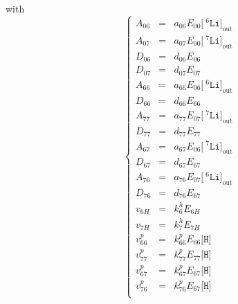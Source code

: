 \documentclass[aps,onecolumn,11pt]{revtex4}
\newcommand{\mychem}[1]{\mathtt{#1}}
\newcommand{\myconc}[1]{\big[#1\big]}
\newcommand{\spLi}[1]{{\!~^{#1}\mychem{Li}}}
\newcommand{\Li}[1]{\myconc{\spLi{#1}}}
\newcommand{\spproton}{\mychem{H}}
\newcommand{\proton}{\myconc{\spproton}}
\newcommand{\myout}[1]{{#1}_{\mathrm{out}}}
\newcommand{\LiOut}[1]{\myout{\Li{#1}}}
\begin{document}
with
\begin{equation}
\left\lbrace
\begin{array}{rcl}%
A_{06}   & = & a_{06} E_{00} \LiOut{6}  \\%
A_{07}   & = & a_{07} E_{00} \LiOut{7}  \\%
D_{06}   & = & d_{06} E_{06}            \\%
D_{07}   & = & d_{07} E_{07}            \\%
A_{66}   & = & a_{66} E_{06} \LiOut{6}  \\%
D_{66}   & = & d_{66} E_{66}            \\%
A_{77}   & = & a_{77} E_{07} \LiOut{7}  \\%
D_{77}   & = & d_{77} E_{77}            \\%
A_{67}   & = & a_{67} E_{06} \LiOut{7}  \\%
D_{67}   & = & d_{67} E_{67}            \\%
A_{76}   & = & a_{76} E_{07} \LiOut{6}  \\%
D_{76}   & = & d_{76} E_{67}            \\%
v_{6H}   & = & k^h_6 E_{6H}             \\%
v_{7H}   & = & k^h_7 E_{7H}             \\%
v^p_{66} & = & k^p_{66} E_{66} \proton  \\%
v^p_{77} & = & k^p_{77} E_{77} \proton  \\%
v^p_{67} & = & k^p_{67} E_{67} \proton  \\%
v^p_{76} & = & k^p_{76} E_{67} \proton  \\%
\end{array}
\right.
\end{equation}
\end{document}
